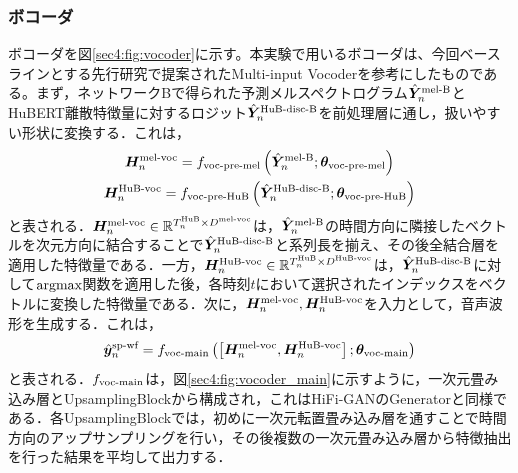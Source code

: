 \subsubsection{ボコーダ}
ボコーダを図\ref{sec4:fig:vocoder}に示す。本実験で用いるボコーダは、今回ベースラインとする先行研究\cite{choi2023intelligible}で提案されたMulti-input Vocoderを参考にしたものである。まず，ネットワークBで得られた予測メルスペクトログラム$\hat{\bm{Y}}^{\text{mel-B}}_{n}$とHuBERT離散特徴量に対するロジット$\hat{\bm{Y}}^{\text{HuB-disc-B}}_{n}$を前処理層に通し，扱いやすい形状に変換する．これは，
\begin{gather}
    \bm{H}^{\text{mel-voc}}_{n} = f_{\text{voc-pre-mel}}\left(\hat{\bm{Y}}^{\text{mel-B}}_{n}; \bm{\theta}_{\text{voc-pre-mel}}\right) \\
    \bm{H}^{\text{HuB-voc}}_{n} = f_{\text{voc-pre-HuB}}\left(\hat{\bm{Y}}^{\text{HuB-disc-B}}_{n}; \bm{\theta}_{\text{voc-pre-HuB}}\right)
\end{gather}
と表される．$\bm{H}^{\text{mel-voc}}_{n} \in \mathbb{R}^{T^{\text{HuB}}_{n} \times D^{\text{mel-voc}}}$は，$\hat{\bm{Y}}^{\text{mel-B}}_{n}$の時間方向に隣接したベクトルを次元方向に結合することで$\hat{\bm{Y}}^{\text{HuB-disc-B}}_{n}$と系列長を揃え、その後全結合層を適用した特徴量である．一方，$\bm{H}^{\text{HuB-voc}}_{n} \in \mathbb{R}^{T^{\text{HuB}}_{n} \times D^{\text{HuB-voc}}}$は，$\hat{\bm{Y}}^{\text{HuB-disc-B}}_{n}$に対して$\text{argmax}$関数を適用した後，各時刻$t$において選択されたインデックスをベクトルに変換した特徴量である．次に，$\bm{H}^{\text{mel-voc}}_{n}, \bm{H}^{\text{HuB-voc}}_{n}$を入力として，音声波形を生成する．これは，
\begin{equation}
    \hat{\bm{y}}^{\text{sp-wf}}_{n} = f_{\text{voc-main}}\left(\left[\bm{H}^{\text{mel-voc}}_{n}, \bm{H}^{\text{HuB-voc}}_{n}\right]; \bm{\theta}_{\text{voc-main}}\right)
\end{equation}
と表される．$f_{\text{voc-main}}$は，図\ref{sec4:fig:vocoder_main}に示すように，一次元畳み込み層とUpsamplingBlockから構成され，これはHiFi-GAN\cite{kong2020hifi}のGeneratorと同様である．各UpsamplingBlockでは，初めに一次元転置畳み込み層を通すことで時間方向のアップサンプリングを行い，その後複数の一次元畳み込み層から特徴抽出を行った結果を平均して出力する．

